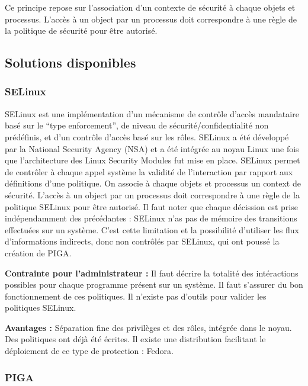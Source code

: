 Ce principe repose sur l'association d'un contexte de sécurité à chaque objets et processus. L'accès à un object par un processus doit correspondre à une règle de la politique de sécurité pour être autorisé. 

\subsection{Solutions disponibles}

\subsubsection{SELinux}

SELinux est une implémentation d'un mécanisme de contrôle d'accès mandataire basé sur le ``type enforcement'', de niveau de sécurité/confidentialité non prédéfinis, et d'un contrôle d'accès basé sur les rôles. SELinux a été développé par la National Security Agency (NSA) et a été intégrée au noyau Linux une fois que l'architecture des Linux Security Modules fut mise en place. SELinux permet de contrôler à chaque appel système la validité de l'interaction par rapport aux définitions d'une politique. On associe à chaque objets et processus un context de sécurité. L'accès à un object par un processus doit correspondre à une règle de la politique SELinux pour être autorisé. Il faut noter que chaque décission est prise indépendamment des précédantes : SELinux n'as pas de mémoire des transitions effectuées sur un système. C'est cette limitation et la possibilité d'utiliser les flux d'informations indirects, donc non contrôlés par SELinux, qui ont poussé la création de PIGA.

\begin{list}{}{}
 \item \textbf{Contrainte pour l'administrateur :} Il faut décrire la totalité des intéractions possibles pour chaque programme présent sur un système. Il faut s'assurer du bon fonctionnement de ces politiques. Il n'existe pas d'outils pour valider les politiques SELinux.
 \item \textbf{Avantages :} Séparation fine des privilèges et des rôles, intégrée dans le noyau. Des politiques ont déjà été écrites. Il existe une distribution facilitant le déploiement de ce type de protection : Fedora.
\end{list}

\subsubsection{PIGA}

